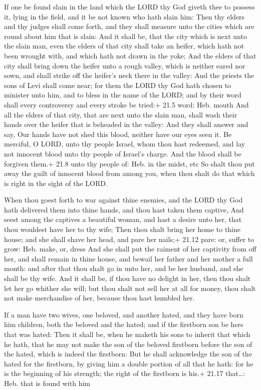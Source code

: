  If one be found slain in the land which the LORD thy God
giveth thee to possess it, lying in the field, and it be not known who
hath slain him:  Then thy elders and thy judges shall come
forth, and they shall measure unto the cities which are round about him
that is slain:  And it shall be, that the city which is next
unto the slain man, even the elders of that city shall take an heifer,
which hath not been wrought with, and which hath not drawn in the yoke;
 And the elders of that city shall bring down the heifer
unto a rough valley, which is neither eared nor sown, and shall strike
off the heifer's neck there in the valley:  And the priests
the sons of Levi shall come near; for them the LORD thy God hath chosen
to minister unto him, and to bless in the name of the LORD; and by their
word shall every controversy and every stroke be tried:+ 21.5 word: Heb.
mouth  And all the elders of that city, that are next unto
the slain man, shall wash their hands over the heifer that is beheaded
in the valley:  And they shall answer and say, Our hands
have not shed this blood, neither have our eyes seen it.  Be
merciful, O LORD, unto thy people Israel, whom thou hast redeemed, and
lay not innocent blood unto thy people of Israel's charge. And the blood
shall be forgiven them.+ 21.8 unto thy people of: Heb. in the midst, etc
 So shalt thou put away the guilt of innocent blood from
among you, when thou shalt do that which is right in the sight of the
LORD.

 When thou goest forth to war against thine enemies, and
the LORD thy God hath delivered them into thine hands, and thou hast
taken them captive,  And seest among the captives a
beautiful woman, and hast a desire unto her, that thou wouldest have her
to thy wife;  Then thou shalt bring her home to thine
house; and she shall shave her head, and pare her nails;+ 21.12 pare:
or, suffer to grow: Heb. make, or, dress  And she shall put
the raiment of her captivity from off her, and shall remain in thine
house, and bewail her father and her mother a full month: and after that
thou shalt go in unto her, and be her husband, and she shall be thy
wife.  And it shall be, if thou have no delight in her,
then thou shalt let her go whither she will; but thou shalt not sell her
at all for money, thou shalt not make merchandise of her, because thou
hast humbled her.

 If a man have two wives, one beloved, and another hated,
and they have born him children, both the beloved and the hated; and if
the firstborn son be hers that was hated:  Then it shall
be, when he maketh his sons to inherit that which he hath, that he may
not make the son of the beloved firstborn before the son of the hated,
which is indeed the firstborn:  But he shall acknowledge
the son of the hated for the firstborn, by giving him a double portion
of all that he hath: for he is the beginning of his strength; the right
of the firstborn is his.+ 21.17 that\ldots: Heb. that is found with him

